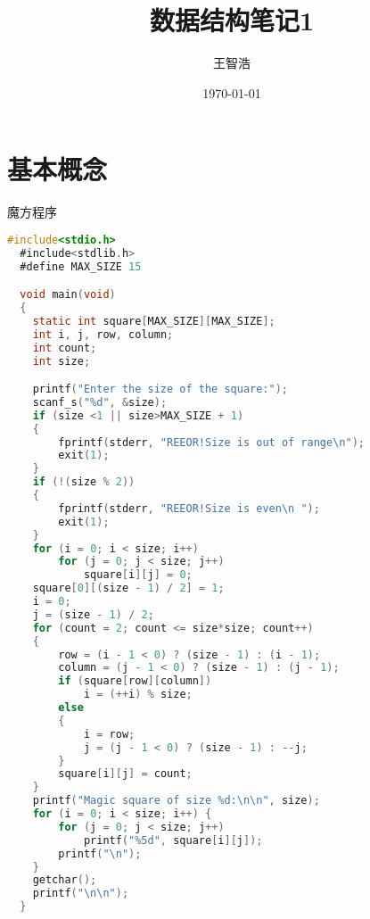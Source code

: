 \documentclass[UTF8]{ctexart}
\title{数据结构笔记1}
\author{王智浩}
\date{\today}
\begin{document}
\maketitle

\newpage
\section {基本概念}
魔方程序
\begin{lstlisting}[language=C]
  #include<stdio.h>
  #include<stdlib.h>
  #define MAX_SIZE 15

  void main(void)
  {
  	static int square[MAX_SIZE][MAX_SIZE];
  	int i, j, row, column;
  	int count;
  	int size;

  	printf("Enter the size of the square:");
  	scanf_s("%d", &size);
  	if (size <1 || size>MAX_SIZE + 1)
  	{
  		fprintf(stderr, "REEOR!Size is out of range\n");
  		exit(1);
  	}
  	if (!(size % 2))
  	{
  		fprintf(stderr, "REEOR!Size is even\n ");
  		exit(1);
  	}
  	for (i = 0; i < size; i++)
  		for (j = 0; j < size; j++)
  			square[i][j] = 0;
  	square[0][(size - 1) / 2] = 1;
  	i = 0;
  	j = (size - 1) / 2;
  	for (count = 2; count <= size*size; count++)
  	{
  		row = (i - 1 < 0) ? (size - 1) : (i - 1);
  		column = (j - 1 < 0) ? (size - 1) : (j - 1);
  		if (square[row][column])
  			i = (++i) % size;
  		else
  		{
  			i = row;
  			j = (j - 1 < 0) ? (size - 1) : --j;
  		}
  		square[i][j] = count;
  	}
  	printf("Magic square of size %d:\n\n", size);
  	for (i = 0; i < size; i++) {
  		for (j = 0; j < size; j++)
  			printf("%5d", square[i][j]);
  		printf("\n");
  	}
  	getchar();
  	printf("\n\n");
  }
\end{lstlisting}
\end{document}
